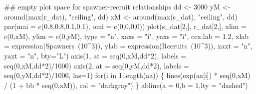 \documentclass[
  11pt,
]{article}
\newenvironment{Shaded}{}{}
\newcommand{\CommentTok}[1]{\textcolor[rgb]{0.00,0.50,0.00}{#1}}
\newcommand{\ControlFlowTok}[1]{\textcolor[rgb]{0.00,0.00,1.00}{#1}}
\newcommand{\DataTypeTok}[1]{#1}
\newcommand{\DecValTok}[1]{#1}
\newcommand{\FloatTok}[1]{#1}
\newcommand{\KeywordTok}[1]{\textcolor[rgb]{0.00,0.00,1.00}{#1}}
\newcommand{\NormalTok}[1]{#1}
\newcommand{\OperatorTok}[1]{#1}
\newcommand{\StringTok}[1]{\textcolor[rgb]{0.00,0.50,0.50}{#1}}
\begin{document}
\begin{Shaded}
\begin{Highlighting}[]
\CommentTok{## empty plot space for spawner-recruit relationships}
\NormalTok{dd <-}\StringTok{ }\DecValTok{3000}
\NormalTok{yM <-}\StringTok{ }\KeywordTok{around}\NormalTok{(}\KeywordTok{max}\NormalTok{(r_dat), }\StringTok{"ceiling"}\NormalTok{, dd)}
\NormalTok{xM <-}\StringTok{ }\KeywordTok{around}\NormalTok{(}\KeywordTok{max}\NormalTok{(s_dat), }\StringTok{"ceiling"}\NormalTok{, dd)}
\KeywordTok{par}\NormalTok{(}\DataTypeTok{mai =} \KeywordTok{c}\NormalTok{(}\FloatTok{0.8}\NormalTok{,}\FloatTok{0.8}\NormalTok{,}\FloatTok{0.1}\NormalTok{,}\FloatTok{0.1}\NormalTok{), }\DataTypeTok{omi =} \KeywordTok{c}\NormalTok{(}\DecValTok{0}\NormalTok{,}\DecValTok{0}\NormalTok{,}\DecValTok{0}\NormalTok{,}\DecValTok{0}\NormalTok{))}
\KeywordTok{plot}\NormalTok{(s_dat[}\DecValTok{2}\NormalTok{,], r_dat[}\DecValTok{2}\NormalTok{,], }\DataTypeTok{xlim =} \KeywordTok{c}\NormalTok{(}\DecValTok{0}\NormalTok{,xM), }\DataTypeTok{ylim =} \KeywordTok{c}\NormalTok{(}\DecValTok{0}\NormalTok{,yM), }\DataTypeTok{type =} \StringTok{"n"}\NormalTok{,}
     \DataTypeTok{xaxs =} \StringTok{"i"}\NormalTok{, }\DataTypeTok{yaxs =} \StringTok{"i"}\NormalTok{, }\DataTypeTok{cex.lab =} \FloatTok{1.2}\NormalTok{,}
     \DataTypeTok{xlab =} \KeywordTok{expression}\NormalTok{(Spawners}\OperatorTok{~}\NormalTok{(}\DecValTok{10}\OperatorTok{^}\DecValTok{3}\NormalTok{)),}
     \DataTypeTok{ylab =} \KeywordTok{expression}\NormalTok{(Recruits}\OperatorTok{~}\NormalTok{(}\DecValTok{10}\OperatorTok{^}\DecValTok{3}\NormalTok{)),}
     \DataTypeTok{xaxt =} \StringTok{"n"}\NormalTok{, }\DataTypeTok{yaxt =} \StringTok{"n"}\NormalTok{, }\DataTypeTok{bty=}\StringTok{"L"}\NormalTok{)}
\KeywordTok{axis}\NormalTok{(}\DecValTok{1}\NormalTok{, }\DataTypeTok{at =} \KeywordTok{seq}\NormalTok{(}\DecValTok{0}\NormalTok{,xM,dd}\OperatorTok{*}\DecValTok{2}\NormalTok{), }\DataTypeTok{labels =} \KeywordTok{seq}\NormalTok{(}\DecValTok{0}\NormalTok{,xM,dd}\OperatorTok{*}\DecValTok{2}\NormalTok{)}\OperatorTok{/}\DecValTok{1000}\NormalTok{)}
\KeywordTok{axis}\NormalTok{(}\DecValTok{2}\NormalTok{, }\DataTypeTok{at =} \KeywordTok{seq}\NormalTok{(}\DecValTok{0}\NormalTok{,yM,dd}\OperatorTok{*}\DecValTok{2}\NormalTok{), }\DataTypeTok{labels =} \KeywordTok{seq}\NormalTok{(}\DecValTok{0}\NormalTok{,yM,dd}\OperatorTok{*}\DecValTok{2}\NormalTok{)}\OperatorTok{/}\DecValTok{1000}\NormalTok{, }\DataTypeTok{las=}\DecValTok{1}\NormalTok{)}
\ControlFlowTok{for}\NormalTok{(i }\ControlFlowTok{in} \DecValTok{1}\OperatorTok{:}\KeywordTok{length}\NormalTok{(aa)) \{}
  \KeywordTok{lines}\NormalTok{(}\KeywordTok{exp}\NormalTok{(aa[i]) }\OperatorTok{*}\StringTok{ }\KeywordTok{seq}\NormalTok{(}\DecValTok{0}\NormalTok{,xM) }\OperatorTok{/}\StringTok{ }\NormalTok{(}\DecValTok{1} \OperatorTok{+}\StringTok{ }\NormalTok{bb }\OperatorTok{*}\StringTok{ }\KeywordTok{seq}\NormalTok{(}\DecValTok{0}\NormalTok{,xM)),}
        \DataTypeTok{col =} \StringTok{"darkgray"}\NormalTok{)}
\NormalTok{\}}
\KeywordTok{abline}\NormalTok{(}\DataTypeTok{a =} \DecValTok{0}\NormalTok{,}\DataTypeTok{b =} \DecValTok{1}\NormalTok{,}\DataTypeTok{lty =} \StringTok{"dashed"}\NormalTok{)}


\end{Highlighting}
\end{Shaded}
\end{document}
